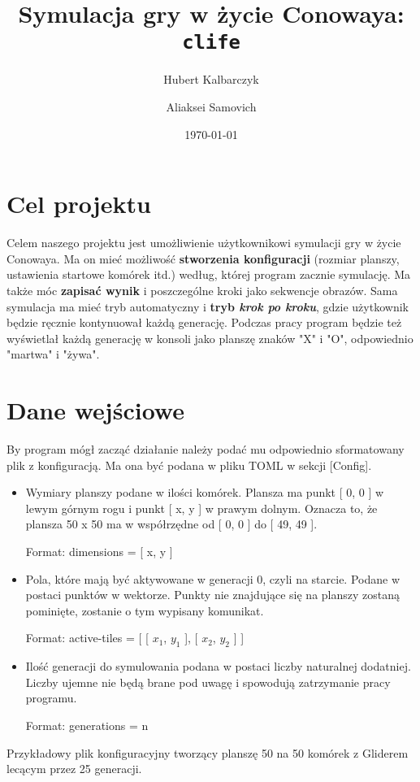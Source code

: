 \documentclass[12pt]{article}
\title{Symulacja gry w życie Conowaya: \texttt{clife}}
\author{
	Hubert Kalbarczyk\\
	\and
	Aliaksei Samovich\\
}
\date{\today}
\begin{document}
\maketitle

\section{Cel projektu}

Celem naszego projektu jest umożliwienie użytkownikowi symulacji gry w życie Conowaya.
Ma on mieć możliwość \textbf{stworzenia konfiguracji} (rozmiar planszy, ustawienia startowe komórek itd.) według, której program zacznie symulację.
Ma także móc \textbf{zapisać wynik} i poszczególne kroki jako sekwencje obrazów.
Sama symulacja ma mieć tryb automatyczny i \textbf{tryb \textit{krok po kroku}}, gdzie użytkownik będzie ręcznie kontynuował każdą generację.
Podczas pracy program będzie też wyświetlał każdą generację w konsoli jako planszę znaków "X" i "O", odpowiednio "martwa" i "żywa".

\section{Dane wejściowe}

By program mógł zacząć działanie należy podać mu odpowiednio sformatowany plik z konfiguracją.
Ma ona być podana w pliku TOML w sekcji [Config].

\begin{itemize}

\item
Wymiary planszy podane w ilości komórek.
Plansza ma punkt [ 0, 0 ] w lewym górnym rogu i punkt [ x, y ] w prawym dolnym.
Oznacza to, że plansza 50 x 50 ma w współrzędne od [ 0, 0 ] do [ 49, 49 ].

Format: dimensions = [ x, y ]

\item
Pola, które mają być aktywowane w generacji 0, czyli na starcie.
Podane w postaci punktów w wektorze.
Punkty nie znajdujące się na planszy zostaną pominięte, zostanie o tym wypisany komunikat.

Format: active-tiles = [ [ $x_1$, $y_1$ ], [ $x_2$, $y_2$ ] ]

\item
Ilość generacji do symulowania podana w postaci liczby naturalnej dodatniej.
Liczby ujemne nie będą brane pod uwagę i spowodują zatrzymanie pracy programu.

Format: generations = n

\end{itemize}
Przykładowy plik konfiguracyjny tworzący planszę 50 na 50 komórek z Gliderem lecącym przez 25 generacji.
\end{document}
